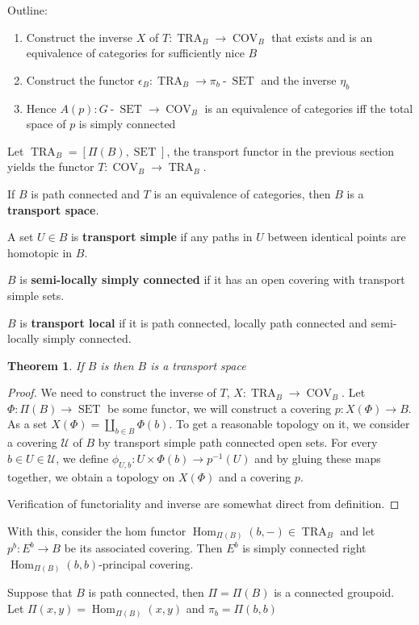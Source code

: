 \documentclass[12pt]{article}
\newtheorem*{thm*}{Theorem}
\newcommand{\mc}{\mathcal}
\DeclareMathOperator{\hyp}{-}
\DeclareMathOperator{\Hom}{Hom}
\DeclareMathOperator{\SET}{SET}
\DeclareMathOperator{\COV}{COV}
\DeclareMathOperator{\TRA}{TRA}
\begin{document}
Outline:
\begin{enumerate}
    \item Construct the inverse $X$ of $T:\TRA_B\to\COV_B$ that exists and is an equivalence of categories for sufficiently nice $B$
    \item Construct the functor $\epsilon_B:\TRA_B\to\pi_b\hyp\SET$ and the inverse $\eta_b$
    \item Hence $A(p):G\hyp\SET\to\COV_B$ is an equivalence of categories iff the total space of $p$ is simply connected
\end{enumerate}

Let $\TRA_B=[\Pi(B),\SET]$, the transport functor in the previous section yields the functor $T:\COV_B\to\TRA_B$.

If $B$ is path connected and $T$ is an equivalence of categories, then $B$ is a \textbf{transport space}.

A set $U\in B$ is \textbf{transport simple} if any paths in $U$ between identical points are homotopic in $B$.

$B$ is \textbf{semi-locally simply connected} if it has an open covering with transport simple sets.

$B$ is \textbf{transport local} if it is path connected, locally path connected and semi-locally simply connected.

\begin{thm*}
    If $B$ is  then $B$ is a transport space
\end{thm*}

\begin{proof}
    We need to construct the inverse of $T$, $X:\TRA_B\to\COV_B$. Let $\Phi:\Pi(B)\to\SET$ be some functor, we will construct a covering $p:X(\Phi)\to B$. As a set $X(\Phi)=\coprod_{b\in B}\Phi(b)$. To get a reasonable topology on it, we consider a covering $\mc U$ of $B$ by transport simple path connected open sets. For every $b\in U\in\mc U$, we define $\phi_{U,b}:U\times\Phi(b)\to p^{-1}(U)$ and by gluing these maps together, we obtain a topology on $X(\Phi)$ and a covering $p$.
    
    Verification of functoriality and inverse are somewhat direct from definition.
\end{proof}

With this, consider the hom functor $\Hom_{\Pi(B)}\left(b,-\right)\in\TRA_B$ and let $p^b:E^b\to B$ be its associated covering. Then $E^b$ is simply connected right $\Hom_{\Pi(B)}\left(b,b\right)$-principal covering.

Suppose that $B$ is path connected, then $\Pi=\Pi(B)$ is a connected groupoid. Let $\Pi(x,y)=\Hom_{\Pi(B)}(x,y)$ and $\pi_b=\Pi(b,b)$
\end{document}
